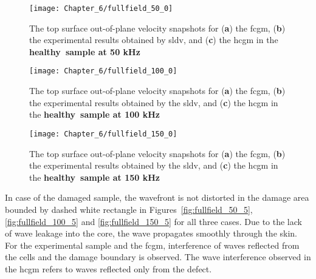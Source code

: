 \documentclass[11pt,a4paper,final]{report}
\theoremstyle{plain}
\begin{document}
\begin{figure}[!hbt]
	\begin{center}
		\texttt{[image: Chapter\_6/fullfield\_50\_0]}
	\end{center}
	\caption{The top surface out-of-plane velocity snapshots for (\textbf{a}) the \acf{fcgm}, (\textbf{b}) the experimental results obtained by \acf{sldv}, and (\textbf{c}) the \acf{hcgm} in the \textbf{healthy~sample at 50 kHz}}
	\label{fig:fullfield_50_0}
\end{figure}
\begin{figure}[!hbt]
	\begin{center}
		\texttt{[image: Chapter\_6/fullfield\_100\_0]}
	\end{center}
	\caption{The top surface out-of-plane velocity snapshots for (\textbf{a}) the \acf{fcgm}, (\textbf{b}) the experimental results obtained by the \acf{sldv}, and (\textbf{c}) the \acf{hcgm} in the \textbf{healthy~sample at 100 kHz}}
	\label{fig:fullfield_100_0}
\end{figure}
\begin{figure}[!hbt]
	\begin{center}
		\texttt{[image: Chapter\_6/fullfield\_150\_0]}
	\end{center}
	\caption{The top surface out-of-plane velocity snapshots for (\textbf{a}) the \acf{fcgm}, (\textbf{b}) the experimental results obtained by the \acf{sldv}, and (\textbf{c}) the \acf{hcgm} in the \textbf{healthy~sample at 150 kHz}}
	\label{fig:fullfield_150_0}
\end{figure}

In case of the damaged sample, the wavefront is not distorted in the damage area bounded by dashed white rectangle in Figures~\ref{fig:fullfield_50_5}, \ref{fig:fullfield_100_5} and \ref{fig:fullfield_150_5} for all three cases.
Due to the lack of wave leakage into the core, the wave propagates smoothly through the skin.
For the experimental sample and the \ac{fcgm}, interference of waves reflected from the cells and the damage boundary is observed.
The wave interference observed in the \ac{hcgm} refers to waves reflected only from the defect.
\end{document}
